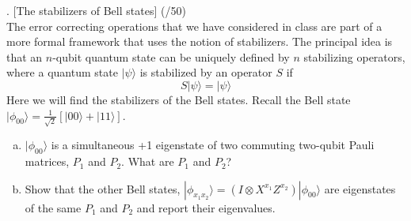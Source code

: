 \documentclass[11pt]{article}
\begin{document}
\newpage

. [The stabilizers of Bell states] (/50)
\\
The error correcting operations that we have considered in class are part of a more formal framework that uses the notion of stabilizers. The principal idea is that an $n$-qubit quantum state can be uniquely defined by $n$ stabilizing operators, where a quantum state $|\psi\rangle$ is stabilized by an operator $S$ if $$S|\psi\rangle = |\psi\rangle$$
Here we will find the stabilizers of the Bell states. Recall the Bell state $|\phi_{00}\rangle=\frac{1}{\sqrt{2}}[|00\rangle+|11\rangle]$.

\begin{enumerate}[(a)]
\item $|\phi_{00}\rangle$ is a simultaneous +1 eigenstate of two commuting two-qubit Pauli matrices, $P_1$ and $P_2$.  What are $P_1$ and $P_2$?
\item Show that the other Bell states, $|\phi_{x_1x_2}\rangle = (I\otimes X^{x_1}Z^{x_2})|\phi_{00}\rangle$ are eigenstates of the same $P_1$ and $P_2$ and report their eigenvalues.
\end{enumerate}
\end{document}
